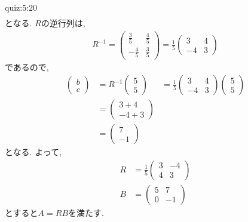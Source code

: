 \begin{answerof}{quiz:5:20}
\begin{align*}
 \end{align*}
 となる.  $R$の逆行列は,
 \begin{align*}
   R^{-1}=
 \begin{pmatrix}\frac{3}{5}&\frac{4}{5}\\-\frac{4}{5}&\frac{3}{5}\end{pmatrix}
=\frac{1}{5} \begin{pmatrix}3&4\\-4&3\end{pmatrix}
 \end{align*}
 であるので,
\begin{align*}
  \begin{pmatrix}b\\c\end{pmatrix}
    &=R^{-1}\begin{pmatrix}5\\5\end{pmatrix}
    &=\frac{1}{5} \begin{pmatrix}3&4\\-4&3\end{pmatrix}\begin{pmatrix}5\\5\end{pmatrix}\\
    &=\begin{pmatrix}3+4\\-4+3\end{pmatrix}\\
    &=\begin{pmatrix}7\\-1\end{pmatrix}
 \end{align*}
となる.
よって,
\begin{align*}
  R&=\frac{1}{5}\begin{pmatrix}3&-4\\4&3\end{pmatrix}\\
  B&=\begin{pmatrix}5&7\\0&-1\end{pmatrix}
\end{align*}
 とすると$A=RB$を満たす.



\end{answerof}
